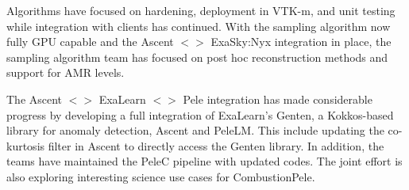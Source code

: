 

Algorithms have  focused on hardening, deployment in VTK-m, and unit testing while integration with clients has continued.  With the sampling algorithm now fully GPU capable and the Ascent $<>$ ExaSky:Nyx integration in place, the sampling algorithm team has focused on post hoc reconstruction methods and support for AMR levels.

The Ascent $<>$ ExaLearn $<>$ Pele integration has made considerable progress by developing a full integration of ExaLearn's Genten, a Kokkos-based library for anomaly detection, Ascent and PeleLM.  This include updating the co-kurtosis filter in Ascent to directly access the Genten library.  In addition, the teams have maintained the PeleC pipeline with updated codes.  The joint effort is also exploring interesting science use cases for CombustionPele.

